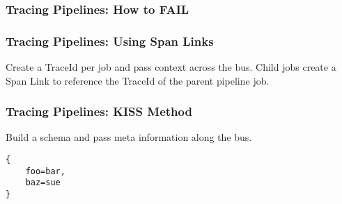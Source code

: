 \begin{frame}
    \frametitle{Tracing Pipelines: How to FAIL}
    \centering
\end{frame}

\begin{frame}
    \frametitle{Tracing Pipelines: Using Span Links}
    \centering
    \raggedright

    Create a TraceId per job and pass context across the bus.  Child jobs
    create a Span Link to reference the TraceId of the parent pipeline job.
\end{frame}

\begin{frame}[fragile]
    \frametitle{Tracing Pipelines: KISS Method}

    Build a schema and pass meta information along the bus.
    \begin{lstlisting}
{
    foo=bar,
    baz=sue
}
    \end{lstlisting}
\end{frame}
